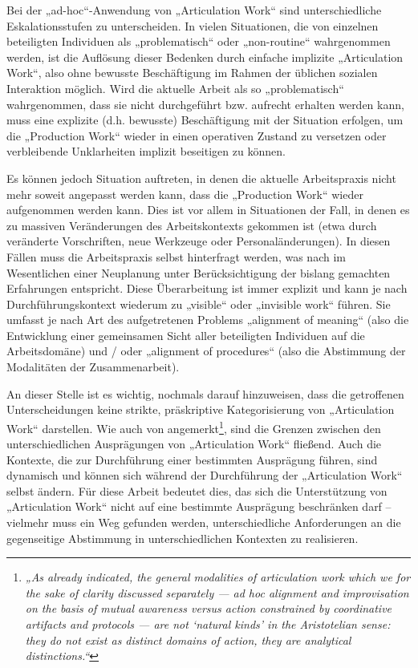 Bei der „ad-hoc“-Anwendung von „Articulation Work“ sind unterschiedliche Eskalationsstufen zu unterscheiden. In vielen Situationen, die von einzelnen beteiligten Individuen als „problematisch“ oder „non-routine“ wahrgenommen werden, ist die Auflösung dieser Bedenken durch einfache implizite „Articulation Work“, also ohne bewusste Beschäftigung im Rahmen der üblichen sozialen Interaktion möglich. Wird die aktuelle Arbeit als so „problematisch“ wahrgenommen, dass sie nicht durchgeführt bzw. aufrecht erhalten werden kann, muss eine explizite (d.h. bewusste) Beschäftigung mit der Situation erfolgen, um die „Production Work“ wieder in einen operativen Zustand zu versetzen oder verbleibende Unklarheiten implizit beseitigen zu können. 

Es können jedoch Situation auftreten, in denen die aktuelle Arbeitspraxis nicht mehr soweit angepasst werden kann, dass die „Production Work“ wieder aufgenommen werden kann. Dies ist vor allem in Situationen der Fall, in denen es zu massiven Veränderungen des Arbeitskontexts gekommen ist (etwa durch veränderte Vorschriften, neue Werkzeuge oder Personaländerungen). In diesen Fällen muss die Arbeitspraxis selbst hinterfragt werden, was nach \citep{Corbin93} im Wesentlichen einer Neuplanung unter Berücksichtigung der bislang gemachten Erfahrungen entspricht. Diese Überarbeitung ist immer explizit und kann je nach Durchführungskontext wiederum zu „visible“ oder „invisible work“ führen. Sie umfasst je nach Art des aufgetretenen Problems „alignment of meaning“ (also die Entwicklung einer gemeinsamen Sicht aller beteiligten Individuen auf die Arbeitsdomäne) und / oder „alignment of procedures“ (also die Abstimmung der Modalitäten der Zusammenarbeit).

An dieser Stelle ist es wichtig, nochmals darauf hinzuweisen, dass die getroffenen Unterscheidungen keine strikte, präskriptive Kategorisierung von „Articulation Work“ darstellen. Wie auch von \citet{Schmidt00} angemerkt\footnote{\emph{„As already indicated, the general modalities of articulation work which we for the sake of clarity discussed separately — ad hoc alignment and improvisation on the basis of mutual awareness versus action constrained by coordinative artifacts and protocols — are not ‘natural kinds’ in the Aristotelian sense: they do not exist as distinct domains of action, they are analytical distinctions.“}\citep[][S. 7]{Schmidt00}}, sind die Grenzen zwischen den unterschiedlichen Ausprägungen von „Articulation Work“ fließend. Auch die Kontexte, die zur Durchführung einer bestimmten Ausprägung führen, sind dynamisch und können sich während der Durchführung der „Articulation Work“ selbst ändern. Für diese Arbeit bedeutet dies, das sich die Unterstützung von „Articulation Work“ nicht auf eine bestimmte Ausprägung beschränken darf -- vielmehr muss ein Weg gefunden werden, unterschiedliche Anforderungen an die gegenseitige Abstimmung in unterschiedlichen Kontexten zu realisieren.


